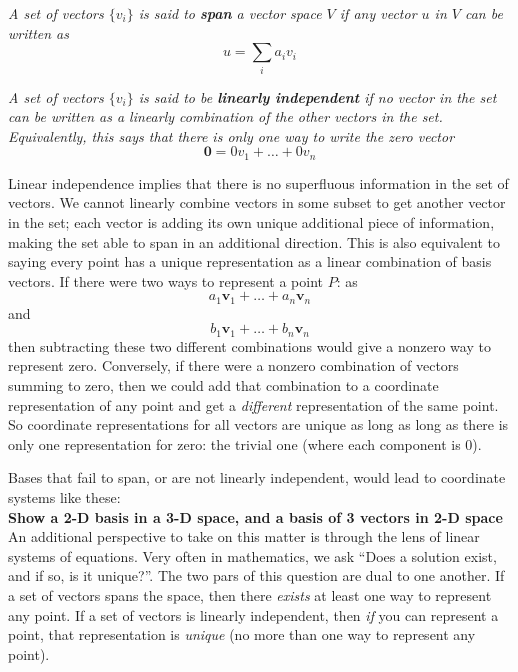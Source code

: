 \begin{defn}
	\textit{A set of vectors $\{v_i\}$ is said to \textbf{span} a vector space $V$ if any vector $u$ in $V$ can be written as} 
	\begin{equation*}
		u = \sum\limits_i a_iv_i
	\end{equation*}
\end{defn}
\begin{defn}
	\textit{A set of vectors $\{v_i\}$ is said to be \textbf{linearly independent} if no vector in the set can be written as a linearly combination of the other vectors in the set.  Equivalently, this says that there is only one way to write the zero vector} 
	\begin{equation*}
		\mathbf 0 =  0v_1 +\dots + 0v_n
	\end{equation*}
\end{defn}
	
	Linear independence implies that there is no superfluous information in the set of vectors.  We cannot linearly combine vectors in some subset to get another vector in the set; each vector is adding its own unique additional piece of information, making the set able to span in an additional direction. This is also equivalent to saying every point has a unique representation as a linear combination of basis vectors. If there were two ways to represent a point $P$: as \begin{equation*}
		a_1 \mathbf v_1 + \dots + a_n \mathbf v_n
	\end{equation*} 
	and 
	\begin{equation*}
		b_1 \mathbf v_1 + \dots + b_n \mathbf v_n
	\end{equation*} 
	then subtracting these two different combinations would give a nonzero way to represent zero. Conversely, if there were a nonzero combination of vectors summing to zero, then we could add that combination to a coordinate representation of any point and get a \emph{different} representation of the same point. So coordinate representations for all vectors are unique as long as long as there is only one representation for zero: the trivial one (where each component is 0).
	
	Bases that fail to span, or are not linearly independent, would lead to coordinate systems like these:\\
	
	\textbf{Show a 2-D basis in a 3-D space, and a basis of 3 vectors in 2-D space}\\

	An additional perspective to take on this matter is through the lens of linear systems of equations.  Very often in mathematics, we ask ``Does a solution exist, and if so, is it unique?''. The two pars of this question are dual to one another. If a set of vectors spans the space, then there \emph{exists} at least one way to represent any point. If a set of vectors is linearly independent, then \emph{if} you can represent a point, that representation is \emph{unique} (no more than one way to represent any point).
	
